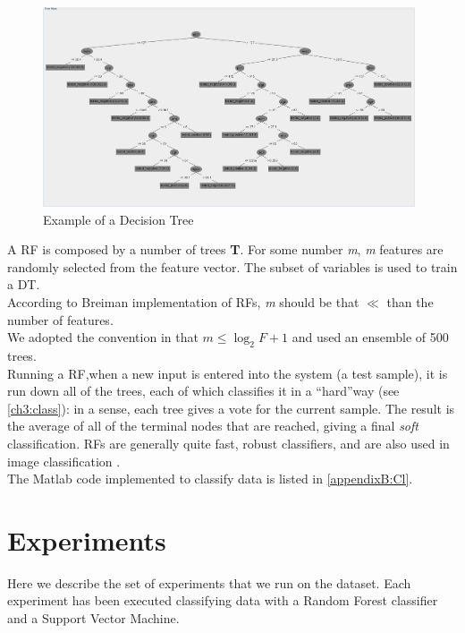 \begin{figure}[!hbt]
  \centering
    \includegraphics[width=0.98\textwidth]{./images/DT_example.png}
  \caption{Example of a Decision Tree}
  \label{ch4:fig6}
\end{figure}

A \Gls{RF} is composed by a number of trees \textbf{T}. For some number \textit{m}, \textit{m} features are randomly selected from the feature vector.
The subset of variables is used to train a \Gls{DT}.\\
According to Breiman implementation of \Glspl{RF}, \textit{m} should be that  $\ll$ than the number of features.\\
We adopted the convention in \cite{randForests03} that $m \leq \log_2 F +1$ and used an ensemble of 500 trees.\\
Running a \Gls{RF},when a new input is entered into the system (a test sample), it is run down all of the trees, each of which classifies
it in a \textquotedblleft hard\textquotedblright way (see \ref{ch3:class}): in a sense, each tree gives a vote for the current sample. 
The result is the average  of all of the terminal nodes that are reached, giving a final \textit{soft} classification.
\Glspl{RF} are generally quite fast, robust classifiers, and are also used in image classification \cite{randForests04}.
\\
The Matlab code implemented to classify data is listed in \ref{appendixB:Cl}.

\vspace{0.5cm}


\section{Experiments}

Here we describe the set of experiments that we run on the dataset. Each experiment has been executed classifying data with a Random Forest classifier and
a Support Vector Machine.

